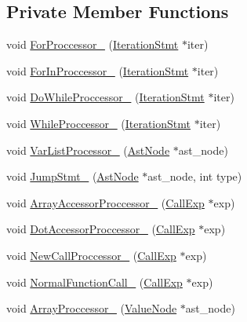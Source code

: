 \subsection*{Private Member Functions}
\begin{DoxyCompactItemize}
\item 
void \hyperlink{classmocha_1_1_codegen_visitor_aaaa6cabbe8c04a0aab7c3a9a26956783}{ForProccessor\_\-} (\hyperlink{classmocha_1_1_iteration_stmt}{IterationStmt} $\ast$iter)
\item 
void \hyperlink{classmocha_1_1_codegen_visitor_ac2b58bbdf7ceab17af317dc9b7148748}{ForInProccessor\_\-} (\hyperlink{classmocha_1_1_iteration_stmt}{IterationStmt} $\ast$iter)
\item 
void \hyperlink{classmocha_1_1_codegen_visitor_acd33c4711ad2da1aa6bf0e8307cdcf3f}{DoWhileProccessor\_\-} (\hyperlink{classmocha_1_1_iteration_stmt}{IterationStmt} $\ast$iter)
\item 
void \hyperlink{classmocha_1_1_codegen_visitor_a0da6f8640afb0d656c8dd37f3a6cb8d3}{WhileProccessor\_\-} (\hyperlink{classmocha_1_1_iteration_stmt}{IterationStmt} $\ast$iter)
\item 
void \hyperlink{classmocha_1_1_codegen_visitor_a41831cab2278e60af618eb82241f968f}{VarListProcessor\_\-} (\hyperlink{classmocha_1_1_ast_node}{AstNode} $\ast$ast\_\-node)
\item 
void \hyperlink{classmocha_1_1_codegen_visitor_a89d8a0fb83b55514867f3208f13fe7cd}{JumpStmt\_\-} (\hyperlink{classmocha_1_1_ast_node}{AstNode} $\ast$ast\_\-node, int type)
\item 
void \hyperlink{classmocha_1_1_codegen_visitor_a077cf4f25bc92526de580991a57154b5}{ArrayAccessorProccessor\_\-} (\hyperlink{classmocha_1_1_call_exp}{CallExp} $\ast$exp)
\item 
void \hyperlink{classmocha_1_1_codegen_visitor_a2d7c50f21f63cfb8f0cb3a15197563bb}{DotAccessorProccessor\_\-} (\hyperlink{classmocha_1_1_call_exp}{CallExp} $\ast$exp)
\item 
void \hyperlink{classmocha_1_1_codegen_visitor_a1bdfafe5fc128e579f652aec4f0f9e71}{NewCallProccessor\_\-} (\hyperlink{classmocha_1_1_call_exp}{CallExp} $\ast$exp)
\item 
void \hyperlink{classmocha_1_1_codegen_visitor_a0cfe3e8a5fa7133ca8a68e1463e56416}{NormalFunctionCall\_\-} (\hyperlink{classmocha_1_1_call_exp}{CallExp} $\ast$exp)
\item 
void \hyperlink{classmocha_1_1_codegen_visitor_a90b161c24a93abae48d1bfc0c8a36410}{ArrayProccessor\_\-} (\hyperlink{classmocha_1_1_value_node}{ValueNode} $\ast$ast\_\-node)

\end{DoxyCompactItemize}
